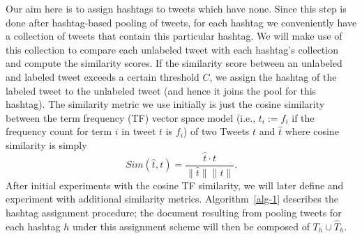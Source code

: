 \documentclass[10pt,a5paper,twoside]{article}
\begin{document}
Our aim here is to assign hashtags to tweets which have none. Since
this step is done after hashtag-based pooling of tweets, for each
hashtag we conveniently have a collection of tweets that contain this
particular hashtag.  We will make use of this collection to compare
each unlabeled tweet with each hashtag's collection and compute the
similarity scores. If the similarity score between an unlabeled and
labeled tweet exceeds a certain threshold $C$, we assign the hashtag
of the labeled tweet to the unlabeled tweet (and hence it joins the
pool for this hashtag). The similarity metric we use initially is
just the cosine similarity between the term frequency (TF) vector
space model (i.e., $t_i := f_i$ if the frequency count for term $i$ in
tweet $t$ is $f_i$) of two Tweets $t$ and $\hat{t}$ where cosine
similarity is simply
\begin{equation*}
  \mathit{Sim}(\hat{t},t) = \frac{\hat{t} \cdot t}{\|\hat{t}\| \|t\|}.
\end{equation*}
After initial experiments with the cosine TF similarity, 
we will later define and experiment with additional similarity metrics.
Algorithm~\ref{alg-1} describes the hashtag assignment procedure;
the document resulting from pooling tweets for each hashtag $h$ under
this assignment scheme will then be composed of $T_h \cup \hat{T}_h$.


\end{document}
